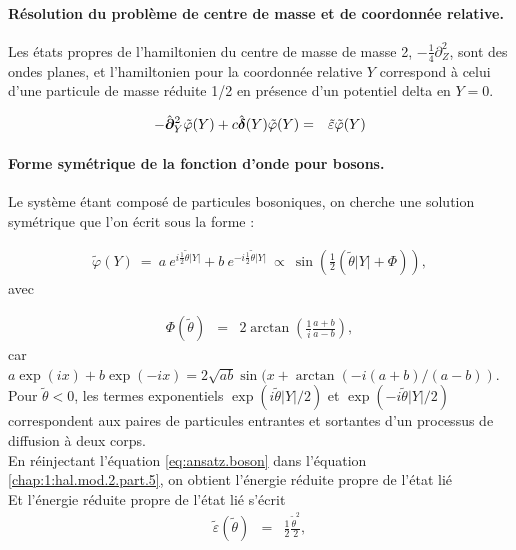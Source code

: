 \paragraph{Résolution du problème de centre de masse et de coordonnée relative.}
Les états propres de l'hamiltonien du centre de masse de masse 2, $-\frac{1}{4} \partial_Z^2$, sont des ondes planes, et l'hamiltonien pour la coordonnée relative $Y$ correspond à celui d'une particule de masse réduite 1/2 en présence d'un potentiel delta en $Y = 0$. 

\begin{eqnarray}\label{chap:1:hal.mod.2.part.5}
	- 	\hat{\bm{\partial}}_Y^2 \tilde{\varphi}(Y) + c \hat{\bm{\delta}} ( Y )\tilde{\varphi}(Y) & = & \tilde{\varepsilon}\tilde{\varphi}(Y) 
\end{eqnarray}
\paragraph{Forme symétrique de la fonction d'onde pour bosons.}
Le système étant composé de particules bosoniques, on cherche une solution symétrique que l’on écrit sous la forme :


\begin{eqnarray}
	\tilde{\varphi}(Y) ~=~a~e^{i\frac{1}{2} \tilde{\theta} \vert Y \vert } + b~e^{-i\frac{1}{2} \tilde{\theta}\vert Y \vert } ~\propto~  \sin\left( \frac{1}{2} (\tilde{\theta} |Y| + \Phi ) \right), \label{eq:ansatz.boson}
\end{eqnarray}
avec  

\begin{eqnarray}
	\Phi(\tilde{\theta}) &=& 2 \arctan\left (\frac{1}{i} \frac{a+b}{a-b}\right),	\label{chap:1:dif.mod.2.part.1} 
\end{eqnarray}
car $a\exp(ix)+b\exp(-ix) = 2\sqrt{ab}\sin(x+\arctan(-i (a+b)/(a-b))$. Pour $\tilde{\theta}<0$, les termes exponentiels \( \exp(i\tilde{\theta} \vert Y \vert/2 ) \) et \( \exp(-i\tilde{\theta} \vert Y \vert/2 ) \) correspondent aux paires de particules entrantes et sortantes d’un processus de diffusion à deux corps.\\

En réinjectant l'équation \eqref{eq:ansatz.boson} dans l’équation \eqref{chap:1:hal.mod.2.part.5}, on obtient l’énergie réduite propre de l’état lié\\ %
{\color{blue} Et l’énergie réduite propre de l’état lié s'écrit } 
\begin{eqnarray}
	\tilde{\varepsilon}(\tilde{\theta})  & = &  \frac{1}{2}\frac{\tilde{\theta}^2}{2},	
\end{eqnarray}

